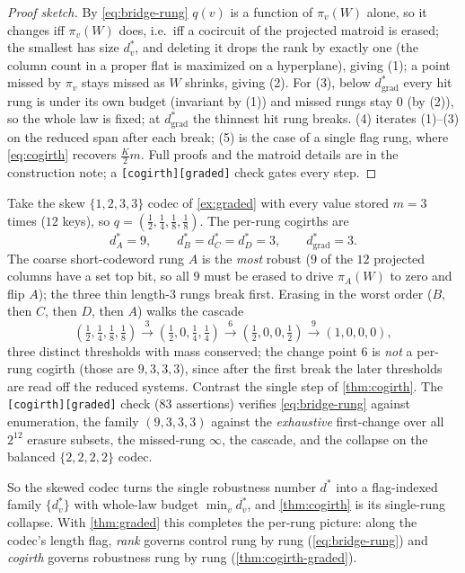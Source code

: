 \documentclass[sigconf,nonacm,anonymous,balance=false]{acmart}
\newcommand{\W}{W}                          %
\newcommand{\proj}{\pi}                     %
\begin{document}
\begin{proof}[Proof sketch]
By \eqref{eq:bridge-rung} $q(v)$ is a function of $\proj_v(\W)$ alone, so it changes iff
$\proj_v(\W)$ does, i.e.\ iff a cocircuit of the projected matroid is erased; the smallest
has size $d^\ast_v$, and deleting it drops the rank by exactly one (the column count in a
proper flat is maximized on a hyperplane), giving (1); a point missed by $\proj_v$ stays
missed as $\W$ shrinks, giving (2). For (3), below $d^\ast_{\mathrm{grad}}$ every hit rung is
under its own budget (invariant by (1)) and missed rungs stay $0$ (by (2)), so the whole law
is fixed; at $d^\ast_{\mathrm{grad}}$ the thinnest hit rung breaks. (4) iterates (1)--(3) on
the reduced span after each break; (5) is the case of a single flag rung, where
\eqref{eq:cogirth} recovers $\tfrac{K}{2}m$. Full proofs and the matroid details are in the
construction note; a \texttt{[cogirth][graded]} check gates every step.
\end{proof}

\begin{example}
\label{ex:cogirth-graded}
Take the skew $\{1,2,3,3\}$ codec of \cref{ex:graded} with every value stored $m = 3$ times
($12$ keys), so $q = (\tfrac12,\tfrac14,\tfrac18,\tfrac18)$. The per-rung cogirths are
\[
  d^\ast_A = 9, \qquad d^\ast_B = d^\ast_C = d^\ast_D = 3, \qquad d^\ast_{\mathrm{grad}} = 3.
\]
The coarse short-codeword rung $A$ is the \emph{most} robust ($9$ of the $12$ projected
columns have a set top bit, so all $9$ must be erased to drive $\proj_A(\W)$ to zero and flip
$A$); the three thin length-$3$
rungs break first. Erasing in the worst order ($B$, then $C$, then $D$, then $A$) walks the
cascade
\[
  (\tfrac12,\tfrac14,\tfrac18,\tfrac18)
  \xrightarrow{\;3\;} (\tfrac12, 0, \tfrac14, \tfrac14)
  \xrightarrow{\;6\;} (\tfrac12, 0, 0, \tfrac12)
  \xrightarrow{\;9\;} (1, 0, 0, 0),
\]
three distinct thresholds with mass conserved; the change point $6$ is \emph{not} a per-rung
cogirth (those are $9,3,3,3$), since after the first break the later thresholds are read off
the reduced systems. Contrast the single step of \cref{thm:cogirth}. The
\texttt{[cogirth][graded]} check ($83$ assertions) verifies \eqref{eq:bridge-rung} against
enumeration, the family $(9,3,3,3)$ against the \emph{exhaustive} first-change over all
$2^{12}$ erasure subsets, the missed-rung $\infty$, the cascade, and the collapse on the
balanced $\{2,2,2,2\}$ codec.
\end{example}

So the skewed codec turns the single robustness number $d^\ast$ into a flag-indexed family
$\{d^\ast_v\}$ with whole-law budget $\min_v d^\ast_v$, and \cref{thm:cogirth} is its
single-rung collapse. With \cref{thm:graded} this completes the per-rung picture: along the
codec's length flag, \emph{rank} governs control rung by rung (\eqref{eq:bridge-rung}) and
\emph{cogirth} governs robustness rung by rung (\cref{thm:cogirth-graded}).
\end{document}
